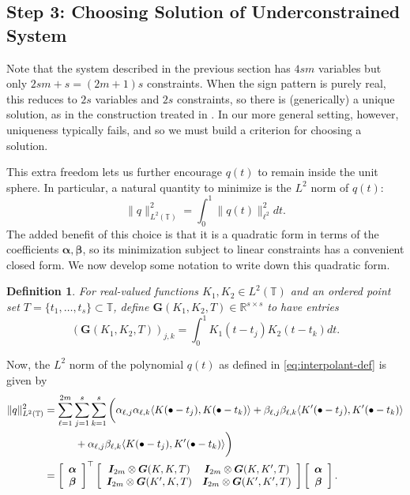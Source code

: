 \documentclass[11pt]{article}
\newcommand{\ra}{\rangle}
\newcommand{\la}{\langle}
\newcommand{\RR}{\mathbb{R}}
\newcommand{\TT}{\mathbb{T}}
\newcommand{\HS}{\hspace{3.5mm}}
\newcommand{\balpha}{\bm \alpha}
\newcommand{\bbeta}{\bm \beta}
\newcommand{\bG}{\bm G}
\newtheorem{definition}{Definition}
\begin{document}
\subsection{Step 3: Choosing Solution of Underconstrained System}

Note that the system described in the previous section has $4sm$ variables but only $2sm + s = (2m + 1)s$ constraints.
When the sign pattern is purely real, this reduces to $2s$ variables and $2s$ constraints, so there is (generically) a unique solution, as in the construction treated in \cite{fernandez2016super}.
In our more general setting, however, uniqueness typically fails, and so we must build a criterion for choosing a solution.

This extra freedom lets us further encourage $q(t)$ to remain inside the unit sphere.
In particular, a natural quantity to minimize is the $L^2$ norm of $q(t)$:
\begin{equation}
    \|q\|_{L^2(\TT)}^2 = \int_0^1 \|q(t)\|_{\ell^2}^2 dt.
\end{equation}
The added benefit of this choice is that it is a quadratic form in terms of the coefficients $\balpha, \bbeta$, so its minimization subject to linear constraints has a convenient closed form.
We now develop some notation to write down this quadratic form.
\begin{definition}
    For real-valued functions $K_1, K_2 \in L^2(\TT)$ and an ordered point set $T = \{t_1, \dots, t_s\} \subset \TT$, define $\bG(K_1, K_2, T) \in \RR^{s \times s}$ to have entries
    \begin{equation}
        (\bG(K_1, K_2, T))_{j, k} = \int_0^1 K_1(t - t_j)K_2(t - t_k)dt.
    \end{equation}
\end{definition}
Now, the $L^2$ norm of the polynomial $q(t)$ as defined in \eqref{eq:interpolant-def} is given by
\begin{align}
  \|q\|_{L^2(\TT)}^2
  &= \sum_{\ell = 1}^{2m} \sum_{j = 1}^s \sum_{k = 1}^s \bigg(\alpha_{\ell, j} \alpha_{\ell, k} \la K(\bullet - t_j), K(\bullet - t_k) \ra
    + \beta_{\ell, j} \beta_{\ell, k} \la K^\prime(\bullet - t_j), K^\prime(\bullet - t_k) \ra \\
    &\HS\HS\HS +\alpha_{\ell, j} \beta_{\ell, k} \la K(\bullet - t_j), K^\prime(\bullet - t_k) \ra\bigg)
  \nonumber \\
  &= \left[\begin{array}{c} \balpha \\ \bbeta \end{array}\right]^\top \left[\begin{array}{cc} \bm I_{2m} \otimes \bG(K, K, T) & \bm I_{2m} \otimes \bG(K, K^\prime, T) \\ \bm I_{2m} \otimes \bG(K^\prime, K, T) & \bm I_{2m} \otimes \bG(K^\prime, K^\prime, T) \end{array}\right]\left[\begin{array}{c} \balpha \\ \bbeta \end{array}\right].
\end{align}
\end{document}
